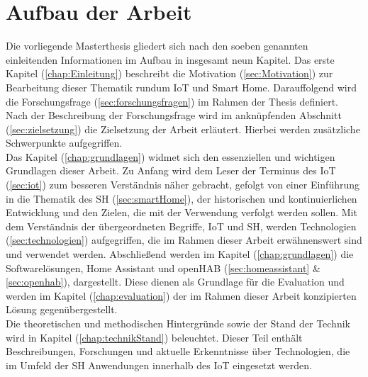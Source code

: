 \section{Aufbau der Arbeit}
\label{sec:aufbau}
    Die vorliegende Masterthesis gliedert sich nach den soeben genannten einleitenden Informationen im Aufbau in insgesamt 
    neun Kapitel. Das erste Kapitel (\ref{chap:Einleitung}) beschreibt die Motivation (\ref{sec:Motivation}) zur Bearbeitung 
    dieser Thematik rundum \acs{IoT} und Smart Home. Darauffolgend wird die 
    Forschungsfrage (\ref{sec:forschungsfragen}) im Rahmen der Thesis definiert. Nach der 
    Beschreibung der Forschungsfrage wird im anknüpfenden Abschnitt (\ref{sec:zielsetzung}) die Zielsetzung der 
    Arbeit erläutert. Hierbei werden zusätzliche Schwerpunkte aufgegriffen. 
    \\
    \linebreak
    Das Kapitel (\ref{chap:grundlagen}) widmet sich den essenziellen und wichtigen Grundlagen dieser Arbeit. Zu Anfang wird dem 
    Leser der Terminus des \acl{IoT} (\ref{sec:iot}) zum besseren Verständnis näher gebracht, 
    gefolgt von einer Einführung in die Thematik des \acl{SH} (\ref{sec:smartHome}), der 
    historischen und kontinuierlichen Entwicklung und den Zielen, die mit der Verwendung verfolgt 
    werden sollen. Mit dem Verständnis der übergeordneten Begriffe, \acs{IoT} und \acl{SH}, werden Technologien 
    (\ref{sec:technologien}) aufgegriffen, die im Rahmen dieser Arbeit erwähnenswert sind und verwendet werden. %
    Abschließend werden im Kapitel (\ref{chap:grundlagen}) die Softwarelösungen, Home Assistant 
    und openHAB (\ref{sec:homeassistant} \& \ref{sec:openhab}), dargestellt. Diese dienen als Grundlage für die Evaluation und werden im Kapitel 
    (\ref{chap:evaluation}) der im Rahmen dieser Arbeit konzipierten Lösung gegenübergestellt. 
    \\
    \linebreak
    Die theoretischen und methodischen Hintergründe sowie der Stand der Technik wird in Kapitel (\ref{chap:technikStand})
    beleuchtet. Dieser Teil enthält Beschreibungen, Forschungen und aktuelle Erkenntnisse über Technologien, die im Umfeld der 
    \acl{SH} Anwendungen innerhalb des \acs{IoT} eingesetzt werden. 
    \\
    \linebreak
